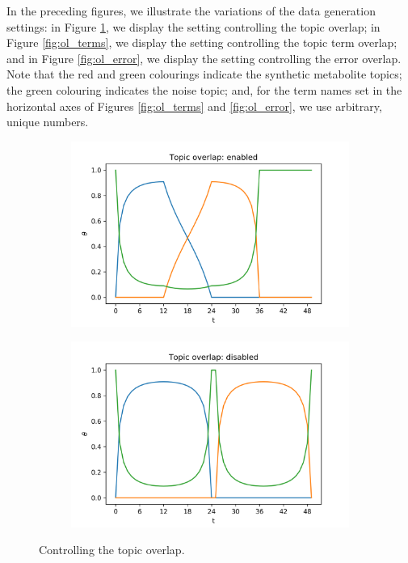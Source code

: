 \documentclass{mpaper}
\begin{document}
\par In the preceding figures, we illustrate the variations of the data generation settings: in Figure \ref{fig:ol_topics}, we display the setting  controlling the topic overlap; in Figure \ref{fig:ol_terms}, we display the setting controlling the topic term overlap; and in Figure \ref{fig:ol_error}, we display the setting controlling the error overlap. Note that the red and green colourings indicate the synthetic metabolite topics; the green colouring indicates the noise topic; and, for the term names set in the horizontal axes of Figures \ref{fig:ol_terms} and \ref{fig:ol_error}, we use arbitrary, unique numbers. 

\begin{figure}
  \centering
  \begin{subfigure}[b]{0.48\textwidth}
    \includegraphics[width=\linewidth]{theta_topic-ol.png}
  \end{subfigure}%

  \begin{subfigure}[b]{0.48\textwidth}
    \includegraphics[width=\linewidth]{theta_topic-nonol.png}
  \end{subfigure}%
  \caption{Controlling the topic overlap.}
  \label{fig:ol_topics}


\end{figure}
\end{document}
